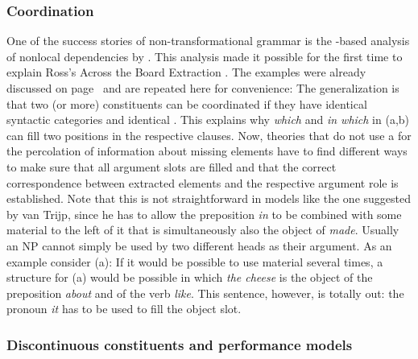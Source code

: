 \subsubsection{Coordination}
\label{sec-coordination}

One of the success stories of non-transformational grammar is the \slasch-based analysis of nonlocal dependencies
by \citet{Gazdar81a}. This analysis made it possible for the first time to explain Ross's Across the Board
Extraction \citep[Section~4.2.4.1]{Ross67a}. The examples were already discussed on
page~\pageref{ex-atb-gazdar} and are repeated here for convenience:
\eal\settowidth{}
\label{ex-atb-gazdar-two}
\zl
The generalization is that two (or more) constituents can be coordinated if they have identical
syntactic categories and identical \slashvs. This explains why \emph{which} and \emph{in which} in
(a,b) can fill two positions in the respective clauses. Now, theories that do not use a
\slashf for the percolation of information about missing elements have to find different ways to
make sure that all argument slots are filled and that the correct correspondence between extracted
elements and the respective argument role is established. Note that this is not straightforward in
models like the one suggested by van Trijp, since he has to allow the preposition \emph{in} to be
combined with some material to the left of it that is simultaneously also the object of
\emph{made}. Usually an NP cannot simply be used by two different heads as their argument. As an
example consider (a):
\eal
{}
\zl
If it would be possible to use material several times, a structure for (a) would be possible
in which \emph{the cheese} is the object of the preposition \emph{about} and of the verb
\emph{like}. This sentence, however, is totally out: the pronoun \emph{it} has to be used to fill
the object slot.


\subsubsection{Discontinuous constituents and performance models}

